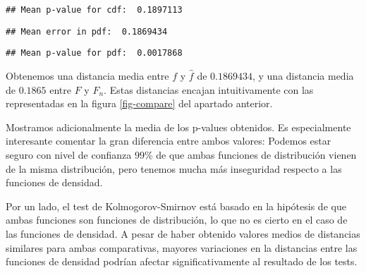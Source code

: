 \documentclass[a4paper]{article}
\begin{document}
\begin{enumerate}[a)]
\begin{verbatim}
## Mean p-value for cdf:  0.1897113
\end{verbatim}

\begin{Shaded}
\begin{Highlighting}[]
\NormalTok{(}\NormalTok{, }\NormalTok{)}
\end{Highlighting}
\end{Shaded}

\begin{verbatim}
## Mean error in pdf:  0.1869434
\end{verbatim}

\begin{Shaded}
\begin{Highlighting}[]
\NormalTok{(}\NormalTok{, }\NormalTok{)}
\end{Highlighting}
\end{Shaded}

\begin{verbatim}
## Mean p-value for pdf:  0.0017868
\end{verbatim}

Obtenemos una distancia media entre $f$ y $\hat f$ de $0.1869434$, y una distancia media de $0.1865$ entre $F$ y $F_n$. Estas distancias encajan intuitivamente con las representadas en la figura \ref{fig-compare} del apartado anterior.

Mostramos adicionalmente la media de los p-values obtenidos. Es especialmente interesante comentar la gran diferencia entre ambos valores: Podemos estar seguro con nivel de confianza $99\%$ de que ambas funciones de distribución vienen de la misma distribución, pero tenemos mucha más inseguridad respecto a las funciones de densidad.

Por un lado, el test de Kolmogorov-Smirnov está basado en la hipótesis de que ambas funciones son funciones de distribución, lo que no es cierto en el caso de las funciones de densidad. A pesar de haber obtenido valores medios de distancias similares para ambas comparativas, mayores variaciones en la distancias entre las funciones de densidad podrían afectar significativamente al resultado de los tests.
	
\end{enumerate}
\end{document}
